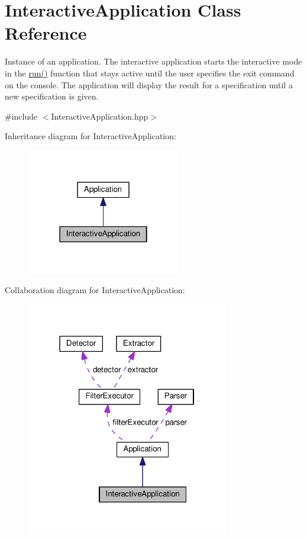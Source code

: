 \hypertarget{classInteractiveApplication}{}\section{Interactive\+Application Class Reference}
\label{classInteractiveApplication}


Instance of an application. The interactive application starts the interactive mode in the \hyperlink{classInteractiveApplication_ae77593fe90fa4fae53dc8ca84ba1a239}{run()} function that stays active until the user specifies the \textquotesingle{}exit\textquotesingle{} command on the console. The application will display the result for a specification until a new specification is given.  




{\ttfamily \#include $<$Interactive\+Application.\+hpp$>$}



Inheritance diagram for Interactive\+Application\+:\nopagebreak
\begin{figure}[H]
\begin{center}
\leavevmode
\includegraphics[width=190pt]{classInteractiveApplication__inherit__graph}
\end{center}
\end{figure}


Collaboration diagram for Interactive\+Application\+:\nopagebreak
\begin{figure}[H]
\begin{center}
\leavevmode
\includegraphics[width=250pt]{classInteractiveApplication__coll__graph}
\end{center}
\end{figure}

